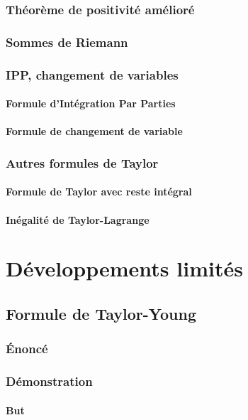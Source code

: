 \documentclass[12pt,a4paper,french]{book}
\begin{document}
		\subsection{Théorème de positivité amélioré}
		\subsection{Sommes de Riemann}
		\subsection{IPP, changement de variables}
			\subsubsection{Formule d'Intégration Par Parties}
			\subsubsection{Formule de changement de variable}
		\subsection{Autres formules de Taylor}
			\subsubsection{Formule de Taylor avec reste intégral}
			\subsubsection{Inégalité de Taylor-Lagrange}

\chapter{Développements limités}
	\section{Formule de Taylor-Young}
		\subsection{Énoncé}
		\subsection{Démonstration}
			\subsubsection{But}
\end{document}
